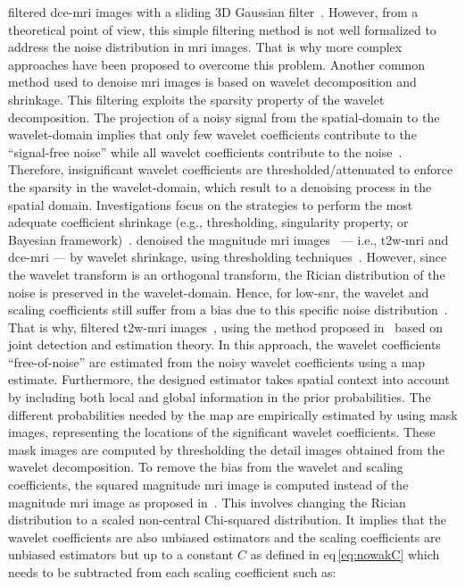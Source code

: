 \citeauthor{samarasinghe2016semi} filtered \ac{dce}-\ac{mri} images with a sliding 3D Gaussian filter~\cite{samarasinghe2016semi}.
However, from a theoretical point of view, this simple filtering method is not well formalized to address the noise distribution in \ac{mri} images.
That is why more complex approaches have been proposed to overcome this problem.
Another common method used to denoise \ac{mri} images is based on wavelet decomposition and shrinkage.
This filtering exploits the sparsity property of the wavelet decomposition.
The projection of a noisy signal from the spatial-domain to the wavelet-domain implies that only few wavelet coefficients contribute to the ``signal-free noise'' while all wavelet coefficients contribute to the noise~\cite{Donoho1994}.
Therefore, insignificant wavelet coefficients are thresholded/attenuated to enforce the sparsity in the wavelet-domain, which result to a denoising process in the spatial domain.
Investigations focus on the strategies to perform the most adequate coefficient shrinkage (e.g., thresholding, singularity property, or Bayesian framework)~\cite{Pizurica2002}.
\citeauthor{Ampeliotis2008} denoised the magnitude \ac{mri} images~\cite{Ampeliotis2007,Ampeliotis2008} --- i.e., \ac{t2w}-\ac{mri} and \ac{dce}-\ac{mri} --- by wavelet shrinkage, using thresholding techniques~\cite{Mallat2008}.
However, since the wavelet transform is an orthogonal transform, the Rician distribution of the noise is preserved in the wavelet-domain.
Hence, for low-\ac{snr}, the wavelet and scaling coefficients still suffer from a bias due to this specific noise distribution~\cite{Nowak1999}.
That is why, \citeauthor{Lopes2011} filtered \ac{t2w}-\ac{mri} images~\cite{Lopes2011}, using the method proposed in~\cite{Pizurica2003} based on joint detection and estimation theory.
In this approach, the wavelet coefficients ``free-of-noise'' are estimated from the noisy wavelet coefficients using a \ac{map} estimate.
Furthermore, the designed estimator takes spatial context into account by including both local and global information in the prior probabilities.
The different probabilities needed by the \ac{map} are empirically estimated by using mask images, representing the locations of the significant wavelet coefficients.
These mask images are computed by thresholding the detail images obtained from the wavelet decomposition.
To remove the bias from the wavelet and scaling coefficients, the squared magnitude \ac{mri} image is computed instead of the magnitude \ac{mri} image as proposed in~\cite{Nowak1999}.
This involves changing the Rician distribution to a scaled non-central Chi-squared distribution.
It implies that the wavelet coefficients are also unbiased estimators and the scaling coefficients are unbiased estimators but up to a constant $C$ as defined in \acs{eq}\,\eqref{eq:nowakC} which needs to be subtracted from each scaling coefficient such as:

